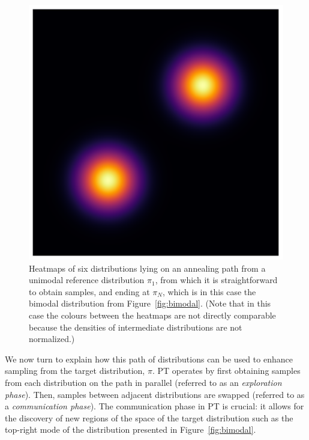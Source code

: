 \begin{figure}[t]
\begin{minipage}{0.15\textwidth}
      \caption*{$\pi_5$}
    \end{minipage}
    \begin{minipage}{0.15\textwidth}
      \centering
      \includegraphics[width=\textwidth]{../img/heatmap_path_6.pdf}
      \caption*{$\pi_6$}
    \end{minipage}
    \caption{Heatmaps of six distributions lying on an annealing path 
    from a unimodal reference distribution  
    $\pi_1$, from which it is straightforward to obtain samples, and ending at 
    $\pi_N$, which is in this case the bimodal distribution from 
    Figure~\ref{fig:bimodal}. (Note that in this case the colours between the heatmaps 
    are not directly comparable because the densities of intermediate distributions 
    are not normalized.)}
    \label{fig:path}
\end{figure}

\medskip
We now turn to explain how this path of distributions can be used to enhance 
sampling from the target distribution, $\pi$. 
PT operates by first obtaining samples from each distribution on the path in parallel 
(referred to as an \textit{exploration phase}). 
Then, samples between adjacent distributions are swapped (referred to as 
a \textit{communication phase}). The communication phase in PT is crucial: it allows 
for the discovery of new regions of the space of the target distribution such as 
the top-right mode of the distribution presented in Figure~\ref{fig:bimodal}. 


